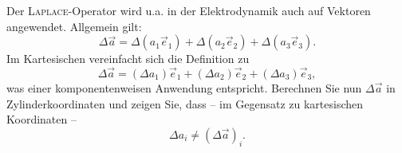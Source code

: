 \begin{atiTask}[
  title = Laplaceoperator in 3 Dimensionen
]

Der \textsc{Laplace}-Operator wird u.a. in der Elektrodynamik auch auf Vektoren angewendet. Allgemein gilt:
\[
\Delta\vec{a}=\Delta (a_1\vec{e}_1)+\Delta (a_2\vec{e}_2)+\Delta (a_3\vec{e}_3).
\]
Im Kartesischen vereinfacht sich die Definition zu
\[
\Delta\vec{a}=(\Delta a_1)\vec{e}_1+(\Delta a_2)\vec{e}_2+(\Delta a_3)\vec{e}_3,
\]
was einer komponentenweisen Anwendung entspricht.
Berechnen Sie nun $\Delta \vec{a}$ in Zylinderkoordinaten und zeigen Sie, dass -- im Gegensatz zu kartesischen Koordinaten --
\[
\Delta a_i\neq (\Delta \vec{a})_i.
\]


\end{atiTask}

% 	
